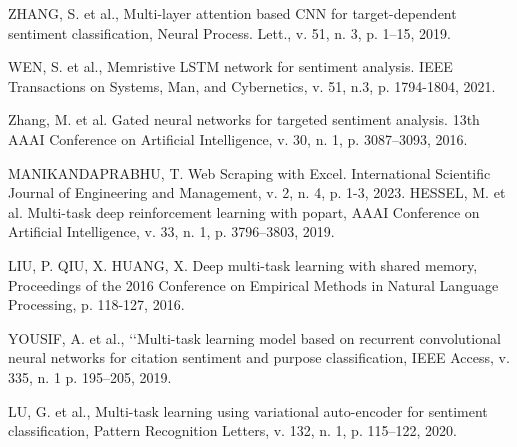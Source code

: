 ZHANG, S. et al., Multi-layer attention based CNN for target-dependent sentiment classification, Neural Process. Lett., v. 51, n. 3, p. 1–15, 2019.

WEN, S. et al., Memristive LSTM network for sentiment analysis. IEEE Transactions on Systems, Man, and Cybernetics, v. 51, n.3, p. 1794-1804, 2021.

Zhang, M. et al. Gated neural networks for targeted sentiment analysis. 13th AAAI Conference on Artificial Intelligence, v. 30, n. 1, p. 3087–3093, 2016.

MANIKANDAPRABHU, T. Web Scraping with Excel. International Scientific Journal of Engineering and Management, v. 2, n. 4, p. 1-3, 2023.
HESSEL, M. et al. Multi-task deep reinforcement learning with popart, AAAI Conference on Artificial Intelligence, v. 33, n. 1, p. 3796–3803, 2019.

LIU, P. QIU, X. HUANG, X. Deep multi-task learning with shared memory, Proceedings of the 2016 Conference on Empirical Methods in Natural Language Processing, p. 118-127, 2016.

YOUSIF, A. et al., ‘‘Multi-task learning model based on recurrent convolutional neural networks for citation sentiment and purpose classification, IEEE Access, v. 335, n. 1 p. 195–205, 2019.

LU, G. et al., Multi-task learning using variational auto-encoder for sentiment classification, Pattern Recognition Letters, v. 132, n. 1, p. 115–122, 2020.
